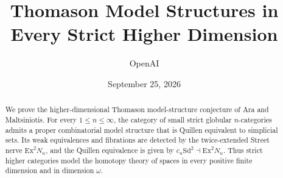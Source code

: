 \documentclass[11pt]{article}
\title{Thomason Model Structures in Every Strict Higher Dimension}
\author{OpenAI}
\date{September 25, 2026}
\numberwithin{equation}{section}
\theoremstyle{definition}
\theoremstyle{remark}
\newcommand{\Sd}{\mathrm{Sd}}
\newcommand{\Ex}{\mathrm{Ex}}
\begin{document}
\maketitle
\begin{abstract}
We prove the higher-dimensional Thomason model-structure conjecture of
Ara and Maltsiniotis. For every $1\le n\le\infty$, the category of small
strict globular $n$-categories admits a proper combinatorial model structure
that is Quillen equivalent to simplicial sets. Its weak equivalences and
fibrations are detected by the twice-extended Street nerve $\Ex^2N_n$, and
the Quillen equivalence is given by $c_n\Sd^2\dashv\Ex^2N_n$. Thus strict
higher categories model the homotopy theory of spaces in every positive
finite dimension and in dimension $\omega$.
\end{abstract}
\tableofcontents







\appendix




\end{document}
